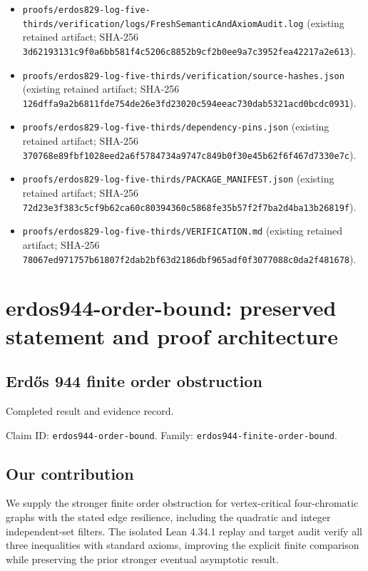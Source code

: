 \documentclass[11pt,a4paper]{article}
\begin{document}
\begin{itemize}
\item \texttt{proofs/erdos829-log-five-thirds/verification/logs/FreshSemanticAndAxiomAudit.log} (existing retained artifact; SHA-256 \texttt{3d62193131c9f0a6bb581f4c5206c8852b9cf2b0ee9a7c3952fea42217a2e613}).
\end{itemize}
\begin{itemize}
\item \texttt{proofs/erdos829-log-five-thirds/verification/source-hashes.json} (existing retained artifact; SHA-256 \texttt{126dffa9a2b6811fde754de26e3fd23020c594eeac730dab5321acd0bcdc0931}).
\end{itemize}
\begin{itemize}
\item \texttt{proofs/erdos829-log-five-thirds/dependency-pins.json} (existing retained artifact; SHA-256 \texttt{370768e89fbf1028eed2a6f5784734a9747c849b0f30e45b62f6f467d7330e7c}).
\end{itemize}
\begin{itemize}
\item \texttt{proofs/erdos829-log-five-thirds/PACKAGE\_MANIFEST.json} (existing retained artifact; SHA-256 \texttt{72d23e3f383c5cf9b62ca60c80394360c5868fe35b57f2f7ba2d4ba13b26819f}).
\end{itemize}
\begin{itemize}
\item \texttt{proofs/erdos829-log-five-thirds/VERIFICATION.md} (existing retained artifact; SHA-256 \texttt{78067ed971757b61807f2dab2bf63d2186dbf965adf0f3077088c0da2f481678}).
\end{itemize}
\clearpage
\section{erdos944-order-bound: preserved statement and proof architecture}
\subsection{Erdős 944 finite order obstruction}
Completed result and evidence record.

Claim ID: \texttt{erdos944-order-bound}. Family: \texttt{erdos944-finite-order-bound}.

\subsection{Our contribution}
We supply the stronger finite order obstruction for vertex-critical four-chromatic graphs with the stated edge resilience, including the quadratic and integer independent-set filters. The isolated Lean 4.34.1 replay and target audit verify all three inequalities with standard axioms, improving the explicit finite comparison while preserving the prior stronger eventual asymptotic result.
\end{document}
